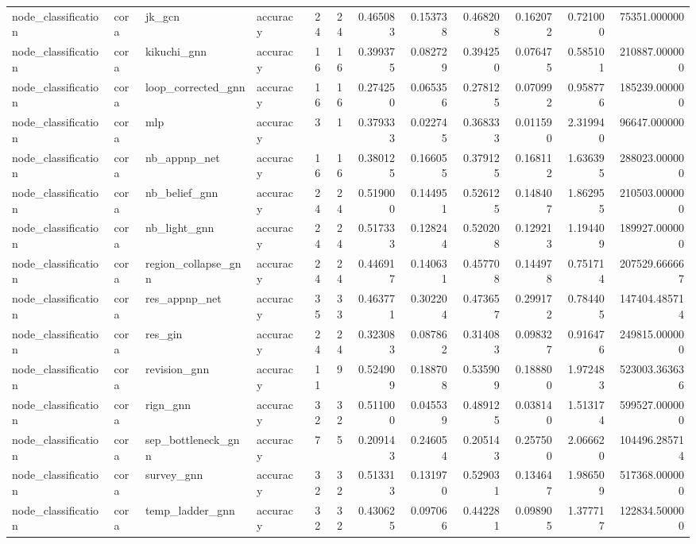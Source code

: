 \begin{tabular}{llllrrrrrrrr}
node_classification & cora & jk_gcn & accuracy & 24 & 24 & 0.465083 & 0.153738 & 0.468208 & 0.162072 & 0.721000 & 75351.000000 \\
node_classification & cora & kikuchi_gnn & accuracy & 16 & 16 & 0.399375 & 0.082729 & 0.394250 & 0.076475 & 0.585101 & 210887.000000 \\
node_classification & cora & loop_corrected_gnn & accuracy & 16 & 16 & 0.274250 & 0.065356 & 0.278125 & 0.070992 & 0.958776 & 185239.000000 \\
node_classification & cora & mlp & accuracy & 3 & 1 & 0.379333 & 0.022745 & 0.368333 & 0.011590 & 2.319940 & 96647.000000 \\
node_classification & cora & nb_appnp_net & accuracy & 16 & 16 & 0.380125 & 0.166055 & 0.379125 & 0.168112 & 1.636395 & 288023.000000 \\
node_classification & cora & nb_belief_gnn & accuracy & 24 & 24 & 0.519000 & 0.144951 & 0.526125 & 0.148407 & 1.862955 & 210503.000000 \\
node_classification & cora & nb_light_gnn & accuracy & 24 & 24 & 0.517333 & 0.128244 & 0.520208 & 0.129213 & 1.194409 & 189927.000000 \\
node_classification & cora & region_collapse_gnn & accuracy & 24 & 24 & 0.446917 & 0.140631 & 0.457708 & 0.144978 & 0.751714 & 207529.666667 \\
node_classification & cora & res_appnp_net & accuracy & 35 & 33 & 0.463771 & 0.302204 & 0.473657 & 0.299172 & 0.784405 & 147404.485714 \\
node_classification & cora & res_gin & accuracy & 24 & 24 & 0.323083 & 0.087862 & 0.314083 & 0.098327 & 0.916476 & 249815.000000 \\
node_classification & cora & revision_gnn & accuracy & 11 & 9 & 0.524909 & 0.188708 & 0.535909 & 0.188800 & 1.972483 & 523003.363636 \\
node_classification & cora & rign_gnn & accuracy & 32 & 32 & 0.511000 & 0.045539 & 0.489125 & 0.038140 & 1.513174 & 599527.000000 \\
node_classification & cora & sep_bottleneck_gnn & accuracy & 7 & 5 & 0.209143 & 0.246054 & 0.205143 & 0.257500 & 2.066620 & 104496.285714 \\
node_classification & cora & survey_gnn & accuracy & 32 & 32 & 0.513313 & 0.131970 & 0.529031 & 0.134647 & 1.986509 & 517368.000000 \\
node_classification & cora & temp_ladder_gnn & accuracy & 32 & 32 & 0.430625 & 0.097066 & 0.442281 & 0.098905 & 1.377717 & 122834.500000 \\

\end{tabular}
